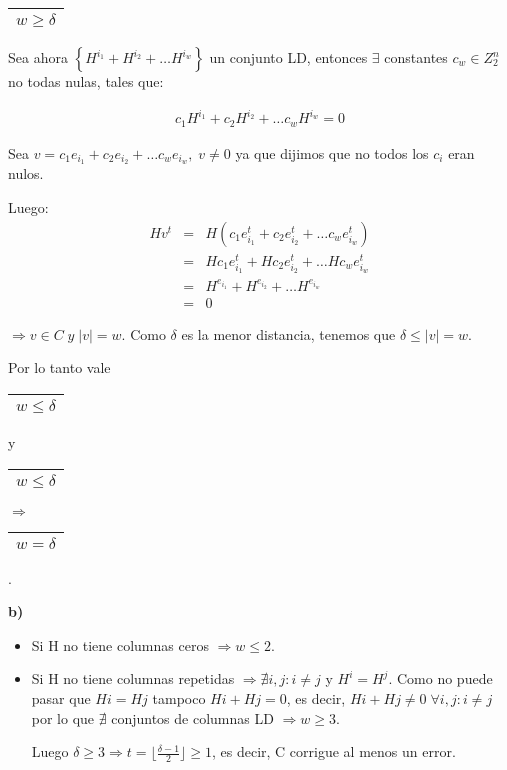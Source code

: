 \documentclass[12pt,a4paper]{report}
\newcounter{neq}
\begin{document}
			\vspace{3mm}
			\begin{tabular}{|c|} \hline $w \geq \delta $ \\\hline \end{tabular} Sea ahora $\left\lbrace H^{i_{1}} + H^{i_{2}} + \dotsc H^{i_{w}} \right\rbrace$ un conjunto LD, entonces $\exists$ constantes $c_{w} \in Z_{2}^{n}$ no todas nulas, tales que:

			\begin{eqnarray}
				\nonumber c_{1} H^{i_{1}} + c_{2} H^{i_{2}} + \dotsc c_{w} H^{i_{w}} = 0
			\end{eqnarray}

			\par Sea $v = c_{1} e_{i_{1}} + c_{2} e_{i_{2}} + \dotsc c_{w} e_{i_{w}} , \; v \neq 0$ ya que dijimos que no todos los $c_{i}$ eran nulos.
			\par Luego:
			\begin{eqnarray}
				\nonumber H v^{t} &=& H (c_{1} e_{i_{1}}^{t} + c_{2} e_{i_{2}}^{t} + \dotsc c_{w} e_{i_{w}}^{t}) \\
				\nonumber &=& H c_{1} e_{i_{1}}^{t} + H c_{2} e_{i_{2}}^{t} + \dotsc H c_{w} e_{i_{w}}^{t} \\
				\nonumber &=& H^{e_{i_{1}}} + H^{e_{i_{2}}} + \dotsc H^{e_{i_{w}}} \\
				\nonumber &=& 0
			\end{eqnarray}
			\par $\Rightarrow v \in C \; y \; \lvert v \rvert = w$. Como $\delta$ es la menor distancia, tenemos que $\delta \leq \lvert v \rvert = w$.

			\vspace{5mm}
			\par Por lo tanto vale \begin{tabular}{|c|} \hline $w \leq \delta $ \\ \hline \end{tabular} y \begin{tabular}{|c|} \hline $w \leq \delta $ \\ \hline \end{tabular} $\Rightarrow$ \begin{tabular}{|c|} \hline $w = \delta $ \\ \hline \end{tabular}.

			\vspace{5mm}
			\textbf{b)}
			\begin{itemize}
				\item Si H no tiene columnas ceros $\Rightarrow w \leq 2$.
				\item Si H no tiene columnas repetidas $\Rightarrow \nexists i,j : i \neq j$ y $H^{i} = H^{j}$. Como no puede pasar que $H{i} = H{j}$ tampoco $H{i} + H{j} = 0$, es decir, $H{i} + H{j} \neq 0 \; \forall i,j : i \neq j$ por lo que $\nexists$ conjuntos de columnas LD $\Rightarrow w \geq 3$.

				\par Luego $\delta \geq 3 \Rightarrow t = \lfloor \frac{\delta-1}{2} \rfloor \geq 1$, es decir, C corrigue al menos un error.
			\end{itemize}
\end{document}
